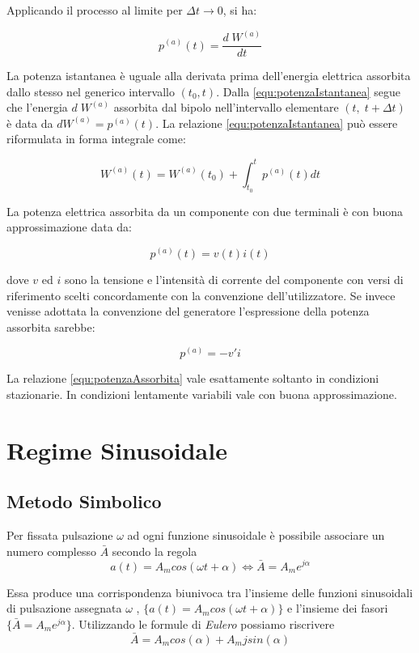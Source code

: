 \documentclass[a4paper]{report}
\begin{document}
Applicando il processo al limite per $\Delta t \rightarrow 0$, si ha:

\begin{equation}\label{equ:potenzaIstantanea}
p^{(a)}(t)=\dfrac{d\;W^{(a)}}{dt}
\end{equation}

La potenza istantanea \`e uguale alla derivata prima dell'energia
elettrica assorbita dallo stesso nel generico intervallo 
$(t_0,t)$. Dalla \ref{equ:potenzaIstantanea} segue che l'energia $d\;
W^{(a)}$ assorbita dal bipolo nell'intervallo elementare $(t,\;
t+\Delta t)$ \`e data da $dW^{(a)}=p^{(a)}(t)$. La relazione
\ref{equ:potenzaIstantanea} pu\`o essere riformulata in forma integrale come:

\[
W^{(a)}(t)=W^{(a)}(t_0)+\int_{t_0}^{t}p^{(a)}(t)dt
\]

La potenza elettrica assorbita da un componente con due terminali \`e
con buona approssimazione data da:

\begin{equation}\label{equ:potenzaAssorbita}
p^{(a)}(t)=v(t)i(t)
\end{equation}

dove $v$ ed $i$ sono la tensione e l'intensit\`a di corrente del
componente con versi di riferimento scelti concordamente con la
convenzione dell'utilizzatore. Se invece venisse adottata la
convenzione del generatore l'espressione della potenza assorbita
sarebbe:

\[
p^{(a)}=-v'i
\]

La relazione \ref{equ:potenzaAssorbita} vale esattamente soltanto in
condizioni stazionarie. In condizioni lentamente variabili vale con
buona approssimazione.

\chapter{Regime Sinusoidale}
\section{Metodo Simbolico}
Per fissata pulsazione $\omega$ ad ogni funzione sinusoidale \`e
possibile associare un numero complesso $\bar{A}$ secondo la regola
\[
a(t) = A_mcos(\omega t+\alpha)\iff \bar{A} = A_me^{j\alpha}
\]

Essa produce una corrispondenza biunivoca tra l'insieme delle funzioni
sinusoidali di pulsazione assegnata $\omega$ , $\{
a(t)=A_mcos(\omega t+\alpha )\}$ e l'insieme dei fasori $\{ \bar{A} =
A_me^{j\alpha} \}$.
Utilizzando le formule di \emph{Eulero} possiamo riscrivere
\[
\bar{A} = A_mcos(\alpha)+ A_mjsin(\alpha)
\]
\end{document}
